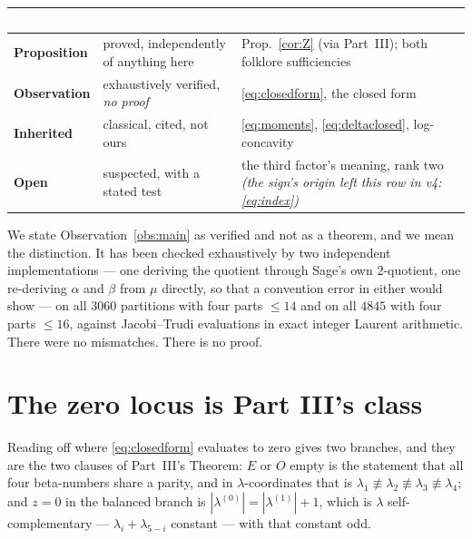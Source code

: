 \documentclass[11pt,a4paper]{article}
\begin{document}
\begin{center}\small
\setlength{\tabcolsep}{4pt}
\begin{tabular}{@{}l l p{6.1cm}@{}}
\toprule
\rowcolor{hdrblue}\textcolor{white}{grade} & \textcolor{white}{what it means} &
\textcolor{white}{instances}\\
\midrule
\textbf{Proposition} & proved, independently of anything here &
Prop.~\ref{cor:Z} (via Part~III); both folklore sufficiencies\\
\rowcolor{softgrey}
\textbf{Observation} & exhaustively verified, \emph{no proof} &
\eqref{eq:closedform}, the closed form\\
\textbf{Inherited} & classical, cited, not ours &
\eqref{eq:moments}, \eqref{eq:deltaclosed}, log-concavity\\
\rowcolor{softgrey}
\textbf{Open} & suspected, with a stated test &
the third factor's meaning, rank two \emph{(the sign's origin left this row in v4:
\eqref{eq:index})}\\
\bottomrule
\end{tabular}
\end{center}

\noindent We state Observation~\ref{obs:main} as verified and not as a theorem, and
we mean the distinction. It has been checked exhaustively by two independent implementations
--- one deriving the quotient through Sage's own $2$-quotient, one re-deriving $\alpha$ and
$\beta$ from $\mu$ directly, so that a convention error in either would show ---
on all $3060$ partitions with four parts $\le14$ and on all $4845$ with four parts $\le16$,
against Jacobi--Trudi evaluations in exact integer Laurent arithmetic. There were no
mismatches. There is no proof.

\section{The zero locus is Part III's class}\label{sec:zero}

Reading off where \eqref{eq:closedform} evaluates to zero gives two branches, and they are the
two clauses of Part~III's Theorem: $E$ or $O$ empty is the statement that all four beta-numbers
share a parity, and in $\lambda$-coordinates that is $\lambda_1\not\equiv\lambda_2\not\equiv
\lambda_3\not\equiv\lambda_4$; and $z=0$ in the balanced branch is
$|\lambda^{(0)}|=|\lambda^{(1)}|+1$, which is $\lambda$ self-complementary --- $\lambda_i+
\lambda_{5-i}$ constant --- with that constant odd.
\end{document}
